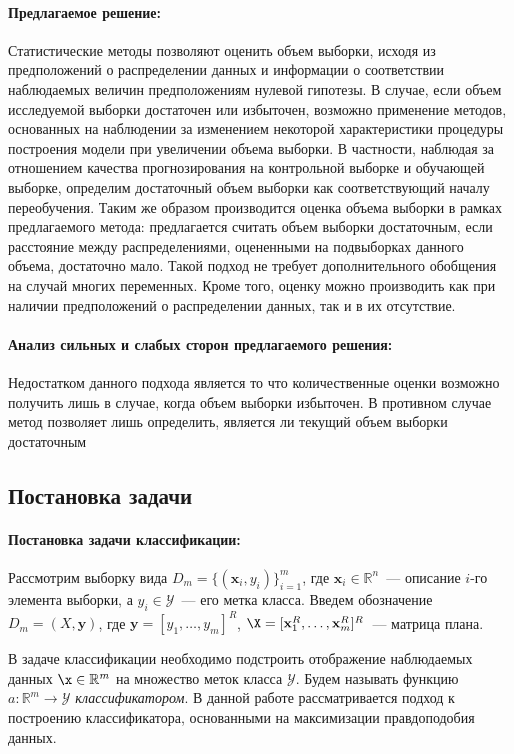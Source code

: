 \documentclass[12pt,twoside]{article}
\begin{document}
\paragraph{Предлагаемое решение:}
Статистические методы позволяют оценить объем выборки, исходя из предположений о распределении данных и информации о соответствии наблюдаемых величин предположениям нулевой гипотезы. В случае, если объем исследуемой выборки достаточен или избыточен, возможно применение методов, основанных на наблюдении за изменением некоторой характеристики процедуры построения модели при увеличении объема выборки. В частности, наблюдая за отношением качества прогнозирования на контрольной выборке и обучающей выборке, определим достаточный объем выборки как соответствующий началу переобучения. Таким же образом производится оценка объема выборки в рамках предлагаемого метода: предлагается считать объем выборки достаточным, если расстояние между распределениями, оцененными на подвыборках данного объема, достаточно мало. Такой подход не требует дополнительного обобщения на случай многих переменных. Кроме того, оценку можно производить как при наличии предположений о распределении данных, так и в их отсутствие.
\paragraph{Анализ сильных и слабых сторон предлагаемого решения:}
Недостатком данного подхода является то что количественные оценки возможно получить лишь в случае, когда объем выборки избыточен. В противном случае метод позволяет лишь определить, является ли текущий объем выборки достаточным

\subsection{Постановка задачи}
\paragraph{Постановка задачи классификации:}
Рассмотрим выборку вида $D_m =\{(\mathbf{x}_i, y_i)\}_{i = 1}^{m}$, где $\mathbf{x}_i\in\mathbb{R}^n$~--- описание $i$-го элемента выборки, а $y_i\in \mathcal{Y}$~--- его метка класса. Введем обозначение $D_m = (X,\mathbf{y})$, где $\mathbf{y} =
[y_1,\dots,y_m]^{R}$, $\X = [\mathbf{x}^{R}_1,\dots,\mathbf{x}^{R}_m]^{R}$~--- матрица плана.

В задаче классификации необходимо подстроить отображение наблюдаемых данных $\x \in \mathbb{R}^m$ на множество меток класса $\mathcal{Y}$. Будем называть функцию $a: \mathbb{R}^{m} \rightarrow \mathcal{Y}$ \textit{классификатором}. В данной работе рассматривается подход к построению классификатора, основанными на
максимизации правдоподобия данных.
\end{document}
